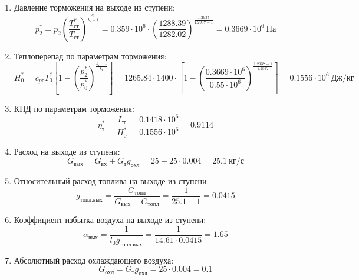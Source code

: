 \documentclass[a4paper,10pt]{article}
\begin{document}
\begin{enumerate}
        \item Давление торможения на выходе из ступени:
        \[
            p_2^* = p_2 \left(
                            \frac{ T_{ст}^* }{ T_{ст} }
                    \right) ^ \frac{ k_г }{ k_г - 1 } =
                 0.359 \cdot 10^6 \cdot \left(
                            \frac{ 1288.39 }{ 1282.02 }
                    \right) ^
                \frac{ 1.2937 }{ 1.2937 - 1 } =
            0.3669 \cdot 10^6 \ Па
        \]

        \item Теплоперепад по параметрам торможения:
        \[
            H_0^* = c_{pг} T_0^* \left[
                        1 - \left(
                                \frac{p_2^*}{p_0^*}
                            \right) ^
                        \frac{k_г - 1}{k_г}
                    \right] =
            1265.84 \cdot 1400 \cdot
                    \left[
                        1 - \left(
                                \frac{
                                    0.3669 \cdot 10^6
                                }{
                                    0.55 \cdot 10^6
                                }
                            \right) ^
                        \frac{1.2937 - 1}{1.2937}
                    \right] =
            0.1556 \cdot 10^6 \ Дж/кг
        \]

        \item КПД по параметрам торможения:
        \[
            \eta_т^* = \frac{ L_т }{ H_0^* } =
                \frac{
                    0.1418 \cdot 10^6
                }{
                    0.1556 \cdot 10^6 } =
            0.9114
        \]

        \item Расход на выходе из ступени:
        \[
            G_{вых} = G_{вх} + G_т g_{охл} =
                25 + 25 \cdot
                0.004 =
            25.1 \ кг/с
        \]

        \item Относительный расход топлива на выходе из ступени:
        \[
            g_{топл.вых} = \frac{ G_{топл} }{ G_{вых} - G_{топл} } =
                 \frac{ 1 }{ 25.1 - 1 } =
            0.0415
        \]

        \item Коэффициент избытка воздуха на выходе из ступени:
        \[
            \alpha_{вых} = \frac{ 1 }{ l_0 g_{топл.вых} } =
                \frac{ 1 }{ 14.61 \cdot 0.0415 } =
            1.65
        \]

        \item Абсолютный расход охлаждающего воздуха:
        \[
            G_{охл} = G_т g_{охл} = 25 \cdot 0.004 =
            0.1
        \]


\end{enumerate}
\end{document}
